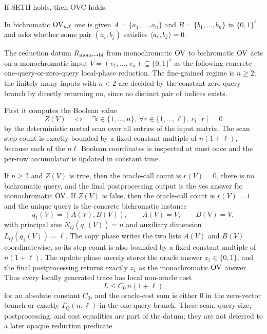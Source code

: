 \begin{theorem}
  \label{thm:seth-implies-ovc}
  \notready
  If SETH holds, then OVC holds.
\end{theorem}

\begin{definition}
  \label{def:bichromatic-ov}
  In bichromatic $\mathrm{OV}_{n,\ell}$ one is given
  $A=\{a_1,\ldots,a_n\}$ and $B=\{b_1,\ldots,b_n\}$ in $\{0,1\}^{\ell}$ and
  asks whether some pair $(a_i,b_j)$ satisfies $\left\langle a_i,b_j\right\rangle=0$.
\end{definition}

\begin{definition}
  \label{def:mono-to-bi-ov-reduction-datum}
  The reduction datum $R_{\rm mono\to bi}$ from monochromatic $\mathrm{OV}$ to
  bichromatic $\mathrm{OV}$ acts on a monochromatic input
  $V=(v_1,\ldots,v_n)\subseteq\{0,1\}^{\ell}$ as the following concrete
  one-query-or-zero-query local-phase reduction.  The fine-grained regime is
  $n\geq2$; the finitely many inputs with $n<2$ are decided by the constant
  zero-query branch by directly returning no, since no distinct pair of indices
  exists.

  First it computes the Boolean value
  \[
    Z(V)\quad\Longleftrightarrow\quad
    \exists i\in\{1,\ldots,n\},\ \forall r\in\{1,\ldots,\ell\},\ v_i[r]=0
  \]
  by the deterministic nested scan over all entries of the input matrix.  The
  scan step count is exactly bounded by a fixed constant multiple of
  $n(1+\ell)$, because each of the $n\ell$ Boolean coordinates is inspected at
  most once and the per-row accumulator is updated in constant time.

  If $n\geq2$ and $Z(V)$ is true, then the oracle-call count is
  $r(V)=0$, there is no bichromatic query, and the final postprocessing output
  is the yes answer for monochromatic $\mathrm{OV}$.  If $Z(V)$ is false, then the
  oracle-call count is $r(V)=1$ and the unique query is the concrete
  bichromatic instance
  \[
    q_1(V)=(A(V),B(V)),\qquad A(V)=V,\qquad B(V)=V,
  \]
  with principal size $N_Q(q_1(V))=n$ and auxiliary dimension
  $L_Q(q_1(V))=\ell$.  The copy phase writes the two lists $A(V)$ and $B(V)$
  coordinatewise, so its step count is also bounded by a fixed constant
  multiple of $n(1+\ell)$.  The update phase merely stores the oracle answer
  $z_1\in\{0,1\}$, and the final postprocessing returns exactly $z_1$ as the
  monochromatic $\mathrm{OV}$ answer.  Thus every locally generated trace has local
  non-oracle cost
  \[
    L\leq C_0\,n(1+\ell)
  \]
  for an absolute constant $C_0$, and the oracle-cost sum is either $0$ in the
  zero-vector branch or exactly
  $T_Q(n,\ell)$ in the one-query branch.  These scan, query-size,
  postprocessing, and cost equalities are part of the datum; they are not
  deferred to a later opaque reduction predicate.
\end{definition}

